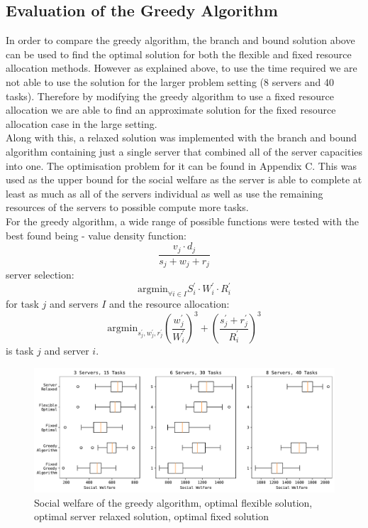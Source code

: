 \subsection{Evaluation of the Greedy Algorithm}
\label{subsec:evaluation-of-the-greedy-algorithm}
In order to compare the greedy algorithm, the branch and bound solution above can be used to find the optimal solution
for both the flexible and fixed resource allocation methods. However as explained above, to use the time required we
are not able to use the solution for the larger problem setting (8 servers and 40 tasks). Therefore by modifying the
greedy algorithm to use a fixed resource allocation we are able to find an approximate solution for the fixed resource
allocation case in the large setting. \\
Along with this, a relaxed solution was implemented with the branch and bound algorithm containing just a single
server that combined all of the server capacities into one. The optimisation problem for it can be found in Appendix C\@.
This was used as the upper bound for the social welfare as the server is able to complete at least as much as all of the
servers individual as well as use the remaining resources of the servers to possible compute more tasks. \\
For the greedy algorithm, a wide range of possible functions were tested with the best found being - value density
function: \[\frac{v_j \cdot d_j}{s_j + w_j + r_j}\] server selection:
\[\text{argmin}_{\forall i \in I} S^{'}_i \cdot W^{'}_i \cdot R^{'}_i\] for task $j$ and servers $I$ and the resource allocation:
\[\text{argmin}_{s^{'}_j, w^{'}_j, r^{'}_j} \left(\frac{w^{'}_j}{W^{'}_i}\right)^3 + \left(\frac{s^{'}_j + r^{'}_j}{R^{'}_i}\right)^3\]
is task $j$ and server $i$.

\begin{figure}
    \centering
    \includegraphics[width=\linewidth]{figs/greedy/multi_setting_social_welfare.pdf}
    \caption{Social welfare of the greedy algorithm, optimal flexible solution, optimal server relaxed solution,
             optimal fixed solution}
    \label{fig:greedy-algorithm-comparison}
\end{figure}


